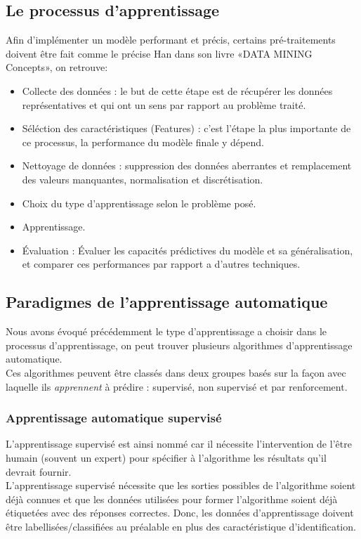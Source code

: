     \subsection{Le processus d'apprentissage}
    Afin d'implémenter un modèle performant et précis, certains pré-traitements doivent être fait comme le précise Han dans son livre «DATA MINING Concepts»\cite{Han}, on retrouve:

    \begin{itemize}
    	\item Collecte des données : le but de cette étape est de récupérer les données représentatives et qui ont un sens par rapport au problème traité.
    	\item Séléction des caractéristiques (Features) : c'est l'étape la plus importante de ce processus, la performance du modèle finale y dépend.
    	\item Nettoyage de données : suppression des données aberrantes et remplacement des valeurs manquantes, normalisation et discrétisation.
    	\item Choix du type d'apprentissage selon le problème posé.
    	\item Apprentissage.
    	\item Évaluation : Évaluer les capacités prédictives du modèle et sa généralisation, et comparer ces performances par rapport a d'autres techniques.
    \end{itemize}

    \subsection{Paradigmes de l'apprentissage automatique}
    Nous avons évoqué précédemment le type d'apprentissage a choisir dans le processus d'apprentissage, on peut trouver plusieurs algorithmes d'apprentissage automatique.\\
    Ces algorithmes peuvent être classés dans deux groupes basés sur la façon avec laquelle ils \emph{apprennent} à prédire : supervisé, non supervisé et par renforcement.

        \subsubsection{Apprentissage automatique supervisé}
        L'apprentissage supervisé est ainsi nommé car il nécessite l'intervention de l'être humain (souvent un expert) pour spécifier à l'algorithme les résultats qu'il devrait fournir.\\
        L'apprentissage supervisé nécessite que les sorties possibles de l'algorithme soient déjà connues et que les données utilisées pour former l'algorithme soient déjà étiquetées avec des réponses correctes. Donc, les données d'apprentissage doivent être labellisées/classifiées au préalable en plus des caractéristique d'identification.\\

